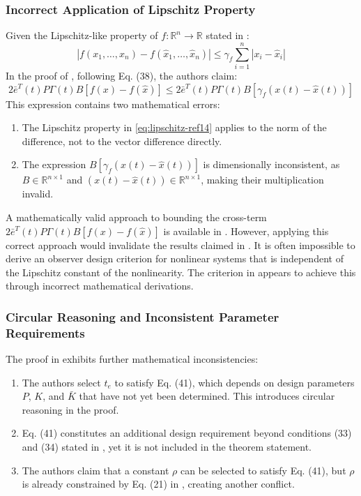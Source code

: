 \documentclass[journal]{IEEEtran}
\begin{document}
\subsubsection{Incorrect Application of Lipschitz Property}

Given the Lipschitz-like property of $f:\mathbb{R}^n\to\mathbb{R}$ stated in \cite{Adil2024}:
\begin{equation}
    \label{eq:lipschitz-ref14}
    |f(x_1,\dots,x_n) - f(\hat{x}_1,\dots,\hat{x}_n)| \leq \gamma_f \sum_{i=1}^n |x_i - \hat{x}_i|
\end{equation}
In the proof of \cite[Theorem 1]{Adil2024}, following Eq. (38), the authors claim:
\[
2\bar{e}^T(t) P \Gamma(t) B [f(x) - f(\hat{x})] \leq 2\bar{e}^T(t) P \Gamma(t) B [\gamma_f (x(t)-\hat{x}(t))]
\]
This expression contains two mathematical errors:
\begin{enumerate}
    \item The Lipschitz property in \eqref{eq:lipschitz-ref14} applies to the norm of the difference, not to the vector difference directly.
    
    \item The expression $B[\gamma_f(x(t)-\hat{x}(t))]$ is dimensionally inconsistent, as $B \in \mathbb{R}^{n \times 1}$ and $(x(t)-\hat{x}(t)) \in \mathbb{R}^{n \times 1}$, making their multiplication invalid.
\end{enumerate}
A mathematically valid approach to bounding the cross-term $2\bar{e}^T(t) P \Gamma(t) B [f(x) - f(\hat{x})]$ is available in \cite{Alessandri2013}. However, applying this correct approach would invalidate the results claimed in \cite{Adil2024}. It is often impossible to derive an observer design criterion for nonlinear systems that is independent of the Lipschitz constant of the nonlinearity. The criterion in \cite[Theorem 1]{Adil2024} appears to achieve this through incorrect mathematical derivations.

\subsubsection{Circular Reasoning and Inconsistent Parameter Requirements}

The proof in \cite[Theorem 1]{Adil2024} exhibits further mathematical inconsistencies:

\begin{enumerate}
    \item The authors select $t_e$ to satisfy Eq. (41), which depends on design parameters $P$, $K$, and $\bar{K}$ that have not yet been determined. This introduces circular reasoning in the proof.
    
    \item Eq. (41) constitutes an additional design requirement beyond conditions (33) and (34) stated in \cite[Theorem 1]{Adil2024}, yet it is not included in the theorem statement.
    
    \item The authors claim that a constant $\rho$ can be selected to satisfy Eq. (41), but $\rho$ is already constrained by Eq. (21) in \cite[Lemma 3]{Adil2024}, creating another conflict.
\end{enumerate}
\end{document}
